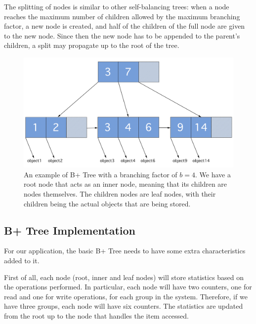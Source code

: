 The splitting of nodes is similar to other self-balancing trees: when a node reaches the maximum number of children allowed by the maximum branching factor, a new node is created, and half of the children of the full node are given to the new node. Since then the new node has to be appended to the parent's children, a split may propagate up to the root of the tree.

\begin{figure}[!htb]
    \centering
    \includegraphics[width=\textwidth,height=\textheight,keepaspectratio]{img/b+tree.png}
    \caption{ An example of B+ Tree with a branching factor of $b=4$. We have a root node that acts as an inner node, meaning that its children are nodes themselves. The children nodes are leaf nodes, with their children being the actual objects that are being stored. }
    \label{fig:b+tree}
\end{figure}


\subsection{B+ Tree Implementation}\label{sec:b+tree-implementation}
For our application, the basic B+ Tree needs to have some extra characteristics added to it. 

First of all, each node (root, inner and leaf nodes) will store statistics based on the operations performed. In particular, each node will have two counters, one for read and one for write operations, for each group in the system. Therefore, if we have three groups, each node will have six counters. The statistics are updated from the root up to the node that handles the item accessed. 

